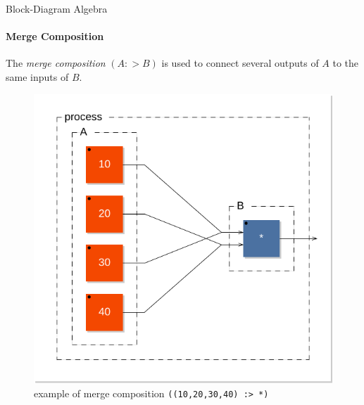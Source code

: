 \begin{frame}[fragile]{Block-Diagram Algebra}
\framesubtitle{Merge Composition}
The \emph{merge composition} $(A:>B)$ is used to connect several outputs
of  $A$ to the same inputs of $B$. 

\begin{figure}[h]
\centering 
\includegraphics[scale=0.5]{images/merge1} 
\caption{example of merge composition \lstinline'((10,20,30,40) :> *)'}  
\label{figure:merge1}
\end{figure}
 
\end{frame}


